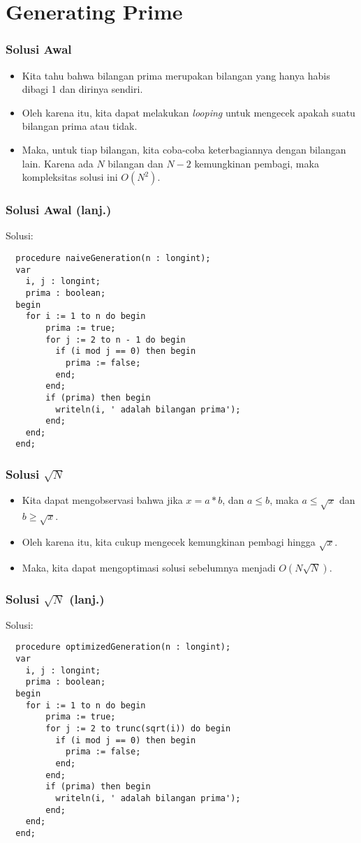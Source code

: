 \section{Generating Prime}
\frame{\sectionpage}

\begin{frame}
\frametitle{Solusi Awal}
\begin{itemize}
  \item Kita tahu bahwa bilangan prima merupakan bilangan yang hanya habis dibagi 1 dan dirinya sendiri.
  \item Oleh karena itu, kita dapat melakukan \textit{looping} untuk mengecek apakah suatu bilangan prima atau tidak.
  \item Maka, untuk tiap bilangan, kita coba-coba keterbagiannya dengan bilangan lain. Karena ada $N$ bilangan dan $N-2$ kemungkinan pembagi, maka kompleksitas solusi ini $O(N^{2})$.
\end{itemize}
\end{frame}

\begin{frame}[fragile]
\frametitle{Solusi Awal (lanj.)}
Solusi:
  \begin{lstlisting}
  procedure naiveGeneration(n : longint);
  var
    i, j : longint;
    prima : boolean;
  begin
    for i := 1 to n do begin
        prima := true;
        for j := 2 to n - 1 do begin
          if (i mod j == 0) then begin
            prima := false;
          end;  
        end;
        if (prima) then begin
          writeln(i, ' adalah bilangan prima');
        end;
    end;
  end;  
  \end{lstlisting}
\end{frame}

\begin{frame}
\frametitle{Solusi $\sqrt{N}$}
\begin{itemize}
  \item Kita dapat mengobservasi bahwa jika $x = a * b$, dan $a \leq b$, maka $a \leq \sqrt{x}$ dan $b \geq \sqrt{x}$.
  \item Oleh karena itu, kita cukup mengecek kemungkinan pembagi hingga $\sqrt{x}$.
  \item Maka, kita dapat mengoptimasi solusi sebelumnya menjadi $O(N\sqrt{N})$.
\end{itemize}
\end{frame}

\begin{frame}[fragile]
\frametitle{Solusi $\sqrt{N}$ (lanj.)}
Solusi:
  \begin{lstlisting}
  procedure optimizedGeneration(n : longint);
  var
    i, j : longint;
    prima : boolean;
  begin
    for i := 1 to n do begin
        prima := true;
        for j := 2 to trunc(sqrt(i)) do begin
          if (i mod j == 0) then begin
            prima := false;
          end;  
        end;
        if (prima) then begin
          writeln(i, ' adalah bilangan prima');
        end;
    end;
  end;  
  \end{lstlisting}
\end{frame}


